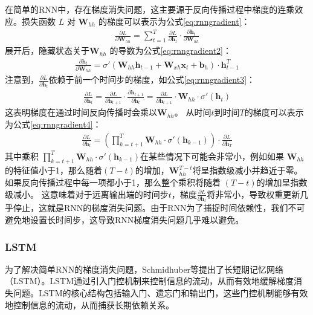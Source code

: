 在简单的RNN中，存在梯度消失问题，这主要源于反向传播过程中梯度的连乘效应\cite{schmidhuber1997long}。损失函数 $L$ 对 $\mathbf{W}_{hh}$ 的梯度可以表示为公式\eqref{eq:rnngradient}：
\begin{align}
  \frac{\partial L}{\partial \mathbf{W}_{hh}} = \sum_{t=1}^{T} \frac{\partial L}{\partial \mathbf{h}_t} \cdot \frac{\partial \mathbf{h}_t}{\partial \mathbf{W}_{hh}} \label{eq:rnngradient}
\end{align}
展开后，隐藏状态关于$\mathbf{W}_{hh}$ 的导数为公式\eqref{eq:rnngradient2}：
\begin{align}
  \frac{\partial \mathbf{h}_t}{\partial \mathbf{W}_{hh}} = \sigma'(\mathbf{W}_{hh} \mathbf{h}_{t-1} + \mathbf{W}_{xh} \mathbf{x}_t + \mathbf{b}_h) \cdot \mathbf{h}_{t-1}^T \label{eq:rnngradient2}
\end{align}
注意到，$\frac{\partial L}{\partial \mathbf{h}_t}$依赖于前一个时间步的梯度，如公式\eqref{eq:rnngradient3}：
\begin{align}
  \frac{\partial L}{\partial \mathbf{h}_t} = \frac{\partial L}{\partial \mathbf{h}_{t+1}} \cdot \frac{\partial \mathbf{h}_{t+1}}{\partial \mathbf{h}_t} = \frac{\partial L}{\partial \mathbf{h}_{t+1}} \cdot \mathbf{W}_{hh} \cdot \sigma'(\mathbf{h}_t) \label{eq:rnngradient3}
\end{align}
这表明梯度在通过时间反向传播时会乘以$\mathbf{W}_{hh}$。
从时间$t$到时间$T$的梯度可以表示为公式\eqref{eq:rnngradient4}：
\begin{align}
  \frac{\partial L}{\partial \mathbf{h}_t} = \left( \prod_{k=t+1}^{T} \mathbf{W}_{hh} \cdot \sigma'(\mathbf{h}_{k-1}) \right) \cdot \frac{\partial L}{\partial \mathbf{h}_T} \label{eq:rnngradient4}
\end{align}
其中乘积 $\prod_{k=t+1}^{T} \mathbf{W}_{hh} \cdot \sigma'(\mathbf{h}_{k-1})$在某些情况下可能会非常小，例如如果 $\mathbf{W}_{hh}$的特征值小于1，那么随着$(T - t)$的增加，$\mathbf{W}_{hh}^{T-t}$将呈指数级减小并趋近于零。
如果反向传播过程中每一项都小于1，那么整个乘积将随着 $(T - t)$的增加呈指数级减小。
这意味着对于远离输出端的时间步$t$，梯度$\frac{\partial L}{\partial \mathbf{h}_t}$将非常小，导致权重更新几乎停止，这就是RNN的梯度消失问题。由于RNN为了捕捉时间依赖性，我们不可避免地设置长时间步，这导致RNN梯度消失问题几乎难以避免。
\subsubsection{LSTM}
为了解决简单RNN的梯度消失问题，Schmidhuber等提出了长短期记忆网络（LSTM）\cite{schmidhuber1997long}。LSTM通过引入门控机制来控制信息的流动，从而有效地缓解梯度消失问题。LSTM的核心结构包括输入门、遗忘门和输出门，这些门控机制能够有效地控制信息的流动，从而捕获长期依赖关系。


